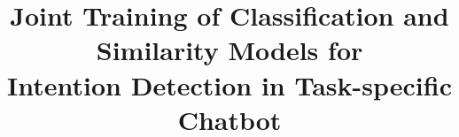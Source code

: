 \documentclass[letterpaper]{article} %
\title{     
  Joint Training of Classification and Similarity Models for \\ 
  Intention Detection in Task-specific Chatbot
}
\begin{document}
  \maketitle
  \linenumbers

  
  
  
  
  
  

  
  
\end{document}
